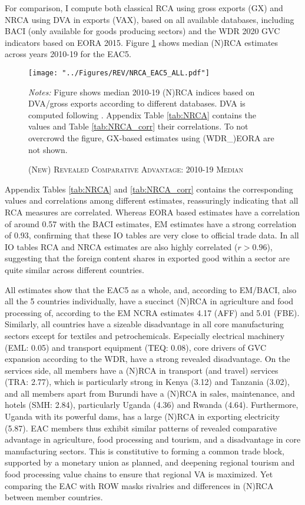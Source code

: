 \documentclass[a4paper]{article}
\begin{document}
For comparison, I compute both classical RCA using gross exports (GX) and NRCA using DVA in exports (VAX), based on all available databases, including BACI (only available for goods producing sectors) and the WDR 2020 GVC indicators based on EORA 2015. Figure \ref{fig:NRCA} shows median (N)RCA estimates across years 2010-19 for the EAC5. 
%
\begin{figure}[h!] %
\centering
\caption{\label{fig:NRCA}\textsc{(New) Revealed Comparative Advantage: 2010-19 Median}}
\texttt{[image: "../Figures/REV/NRCA\_EAC5\_ALL.pdf"]} %
\raggedright
\scriptsize
\emph{Notes:} Figure shows median 2010-19 (N)RCA indices based on DVA/gross exports according to different databases. DVA is computed following \citet{borin2019measuring}. Appendix Table \ref{tab:NRCA} contains the values and Table \ref{tab:NRCA_corr} their correlations. To not overcrowd the figure, GX-based estimates using (WDR\_)EORA are not shown. 
\end{figure}
\FloatBarrier
%
Appendix Tables \ref{tab:NRCA} and \ref{tab:NRCA_corr} contains the corresponding values and correlations among different estimates, %
reassuringly indicating that all RCA measures are correlated. Whereas EORA based estimates have a correlation of around 0.57 with the BACI estimates, EM estimates have a strong correlation of 0.93, confirming that these IO tables are very close to official trade data. In all IO tables RCA and NRCA estimates are also highly correlated ($r > 0.96$), suggesting that the foreign content shares in exported good within a sector are quite similar across different countries. \newline

All estimates show that the EAC5 as a whole, and, according to EM/BACI, also all the 5 countries individually, have a succinct (N)RCA in agriculture and food processing of, according to the EM NCRA estimates 4.17 (AFF) and 5.01 (FBE). Similarly, all countries have a sizeable disadvantage in all core manufacturing sectors except for textiles and petrochemicals. Especially electrical machinery (EML: 0.05) and transport equipment (TEQ: 0.08), core drivers of GVC expansion according to the WDR, have a strong revealed disadvantage. On the services side, all members have a (N)RCA in transport (and travel) services (TRA: 2.77), which is particularly strong in Kenya (3.12) and Tanzania (3.02), and all members apart from Burundi have a (N)RCA in sales, maintenance, and hotels (SMH: 2.84), particularly Uganda (4.36) and Rwanda (4.64). Furthermore, Uganda with its powerful dams, has a large (N)RCA in exporting electricity (5.87). EAC members thus exhibit similar patterns of revealed comparative advantage in agriculture, food processing and tourism, and a disadvantage in core manufacturing sectors. This is constitutive to forming a common trade block, supported by a monetary union as planned, and deepening regional tourism and food processing value chains to ensure that regional VA is maximized. Yet comparing the EAC with ROW masks rivalries and differences in (N)RCA between member countries. 
\end{document}

